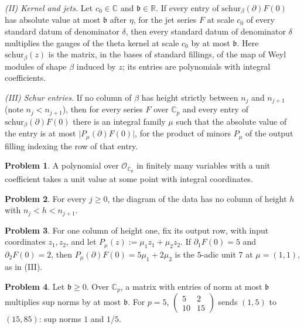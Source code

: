 \documentclass[reqno]{amsart}
\theoremstyle{plain}
\theoremstyle{definition}
\newtheorem{problem}{Problem}[section]
\theoremstyle{remark}
\newcommand{\C}{{\mathbb{C}}}
\newcommand{\Oc}{\mathcal O}
\begin{document}
\emph{(II) Kernel and jets.}  Let \(c_0 \in \C\) and \(\mathfrak b \in \mathbb R\).  If every entry of \(\mathrm{schur}_\beta(\partial)F(0)\) has absolute value at most \(\mathfrak b\) after \(\eta\), for the jet series \(F\) at scale \(c_0\) of every standard datum of denominator \(\delta\), then every standard datum of denominator \(\delta\) multiplies the gauges of the theta kernel at scale \(c_0\) by at most \(\mathfrak b\).  Here \(\mathrm{schur}_\beta(z)\) is the matrix, in the bases of standard fillings, of the map of Weyl modules of shape \(\beta\) induced by \(z\); its entries are polynomials with integral coefficients.

\emph{(III) Schur entries.}  If no column of \(\beta\) has height strictly between \(n_j\) and \(n_{j+1}\) (note \(n_j < n_{j+1}\)), then for every series \(F\) over \(\C_p\) and every entry of \(\mathrm{schur}_\beta(\partial)F(0)\) there is an integral family \(\mu\) such that the absolute value of the entry is at most \(\lvert P_\mu(\partial)F(0)\rvert\), for the product of minors \(P_\mu\) of the output filling indexing the row of that entry.

\begin{problem}\label{pr:unit-value}
A polynomial over \(\Oc_{\C_p}\) in finitely many variables with a unit coefficient takes a unit value at some point with integral coordinates.
\end{problem}

\begin{problem}\label{pr:fits}
For every \(j \ge 0\), the diagram of the data has no column of height \(h\) with \(n_j < h < n_{j+1}\).
\end{problem}

\begin{problem}\label{pr:height-one}
For one column of height one, fix its output row, with input coordinates \(z_1, z_2\), and let \(P_\mu(z) := \mu_1z_1 + \mu_2z_2\).  If \(\partial_1F(0) = 5\) and \(\partial_2F(0) = 2\), then \(P_\mu(\partial)F(0) = 5\mu_1 + 2\mu_2\) is the \(5\)-adic unit \(7\) at \(\mu = (1,1)\), as in (III).
\end{problem}

\begin{problem}\label{pr:entries}
Let \(\mathfrak b \ge 0\).  Over \(\C_p\), a matrix with entries of norm at most \(\mathfrak b\) multiplies sup norms by at most \(\mathfrak b\).  For \(p = 5\), \(\left(\begin{smallmatrix}5&2\\10&15\end{smallmatrix}\right)\) sends \((1,5)\) to \((15,85)\): sup norms \(1\) and \(1/5\).
\end{problem}
\end{document}
